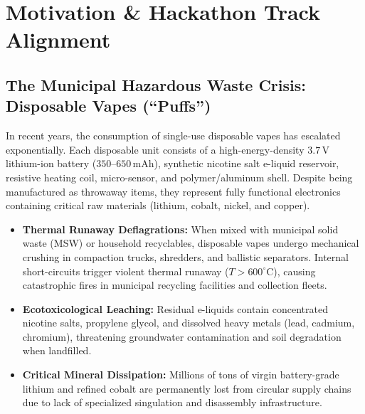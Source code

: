 \documentclass[10pt,a4paper]{article}
\begin{document}
\section{Motivation \& Hackathon Track Alignment}

\subsection{The Municipal Hazardous Waste Crisis: Disposable Vapes (``Puffs'')}
In recent years, the consumption of single-use disposable vapes has escalated exponentially. Each disposable unit consists of a high-energy-density $3.7\,\text{V}$ lithium-ion battery ($350$--$650\,\text{mAh}$), synthetic nicotine salt e-liquid reservoir, resistive heating coil, micro-sensor, and polymer/aluminum shell. Despite being manufactured as throwaway items, they represent fully functional electronics containing critical raw materials (lithium, cobalt, nickel, and copper).
\begin{itemize}
    \item \textbf{Thermal Runaway Deflagrations:} When mixed with municipal solid waste (MSW) or household recyclables, disposable vapes undergo mechanical crushing in compaction trucks, shredders, and ballistic separators. Internal short-circuits trigger violent thermal runaway ($T > 600^\circ\text{C}$), causing catastrophic fires in municipal recycling facilities and collection fleets.
    \item \textbf{Ecotoxicological Leaching:} Residual e-liquids contain concentrated nicotine salts, propylene glycol, and dissolved heavy metals (lead, cadmium, chromium), threatening groundwater contamination and soil degradation when landfilled.
    \item \textbf{Critical Mineral Dissipation:} Millions of tons of virgin battery-grade lithium and refined cobalt are permanently lost from circular supply chains due to lack of specialized singulation and disassembly infrastructure.
\end{itemize}
\end{document}
